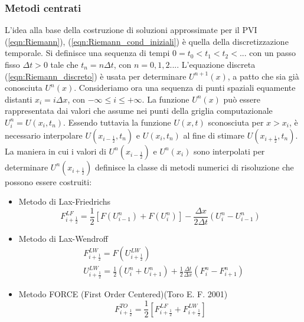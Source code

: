 \documentclass[12pt]{article} %
\begin{document}
\subsubsection{Metodi centrati}
\noindent L'idea alla base della costruzione di soluzioni approssimate per il PVI (\ref{eqn:Riemann}), (\ref{eqn:Riemann_cond_iniziali}) è quella della discretizzazione temporale. Si definisce una sequenza di tempi $0=t_0<t_1<t_2<...$ con un passo fisso $\Delta t>0$ tale che $t_n=n\Delta t$, con $n=0,1,2...$. L'equazione discreta (\ref{eqn:Riemann_discreto}) è usata per determinare  $U^{n+1}(x)$, a patto che sia già conosciuta  $U^{n}(x)$. Consideriamo ora una sequenza di punti spaziali equamente distanti $x_i=i\Delta x$, con $-\infty\leq i \leq+\infty$. La funzione $U^{n}(x)$ può essere rappresentata dai valori che assume nei punti della griglia computazionale $U_i^{n}=U(x_i,t_n)$. Essendo tuttavia la funzione $U(x,t)$ sconosciuta per $x > x_i$, è necessario interpolare $U\left(x_{i-\frac{1}{2}},t_n\right)$ e $U(x_i,t_n)$ al fine di stimare $U\left(x_{i+\frac{1}{2}},t_n\right)$. La maniera in cui i valori di $U^n\left(x_{i-\frac{1}{2}}\right)$ e $U^n(x_i)$ sono interpolati per determinare $U^n\left(x_{i+\frac{1}{2}}\right)$ definisce la classe di metodi numerici di risoluzione che possono essere costruiti:
\begin{itemize}
    \item Metodo di Lax-Friedrichs
    \begin{equation}
        F_{i+\frac{1}{2}}^{LF}=\frac{1}{2}\left[F(U_{i-1}^n)+F(U_i^n)\right]-\frac{\Delta x}{2\Delta t}(U_i^n-U_{i-1}^n)
        \label{eqn:Lax-Friedrichs}
    \end{equation}
    \item Metodo di Lax-Wendroff
        \begin{equation}
        \begin{split}
           &F_{i+\frac{1}{2}}^{LW}=F(U_{i+\frac{1}{2}}^{LW}) \\
           &U_{i+\frac{1}{2}}^{LW}=\frac{1}{2}\left(U_i^n+U_{i+1}^n\right)+\frac{1}{2}\frac{\Delta t}{\Delta x}\left(F_i^n-F_{i+1}^n\right)
        \end{split}
        \label{eqn:Lax-Wendroff}
    \end{equation}
    \item Metodo FORCE (First Order Centered)(Toro E. F. 2001)
    \begin{equation}
        F_{i+\frac{1}{2}}^{TO}=\frac{1}{2}\left[F_{i+\frac{1}{2}}^{LF}+F_{i+\frac{1}{2}}^{LW}\right]
        \label{eqn:FORCE}
        \end{equation}
\end{itemize}
\end{document}
